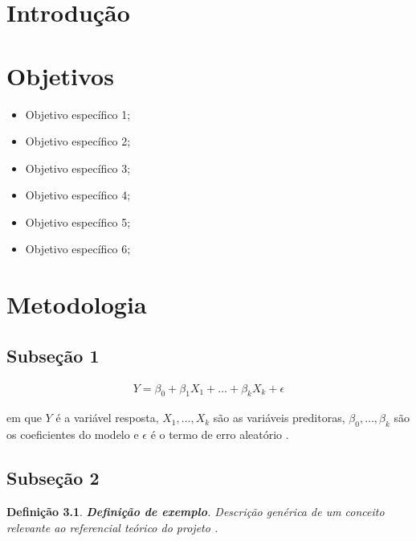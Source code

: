 \documentclass[12pt, consuni, professor]{uftpibic}
\theoremstyle{plain}
\newtheorem{defn}{Definição} %
\begin{document}
\chapter{Introdução}

\lipsum[1-3]

\vspace{1.5cm}
\chapter{Objetivos}

\lipsum[4]

\begin{itemize}
\item Objetivo específico 1;
\item Objetivo específico 2;
\item Objetivo específico 3;
\item Objetivo específico 4;
\item Objetivo específico 5;
\item Objetivo específico 6;
\end{itemize}


\vspace{1.5cm}
\chapter{Metodologia}

\section{Subseção 1}

\lipsum[5-6]

\begin{eqnarray}
Y = \beta_0 + \beta_1 X_1 + \dots + \beta_k X_k + \epsilon
\label{eq:01}
\end{eqnarray}

\noindent em que $Y$ é a variável resposta, $X_1,\dots,X_k$ são as variáveis preditoras, $\beta_0,\dots,\beta_k$ são os coeficientes do modelo e $\epsilon$ é o termo de erro aleatório \cite{degroot2012}.

\section{Subseção 2}

\lipsum[7-9]

\begin{defn}
\textbf{Definição de exemplo}. Descrição genérica de um conceito relevante ao referencial teórico do projeto \cite{degroot2012}.
\end{defn}
\end{document}

